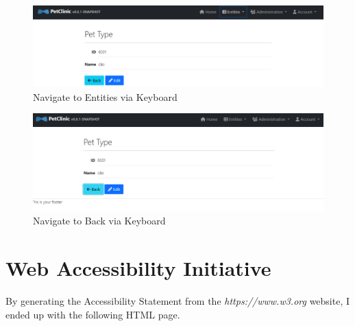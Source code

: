 \documentclass[a4paper,11pt,openright,BCOR=15mm]{scrbook}
\begin{document}
\begin{figure}[H]
	\centering
	\includegraphics[width=\textwidth]{figs/Accessibility/Entities Selected.png}
	\caption{Navigate to Entities via Keyboard}
	\label{fig:EntitiesSelected}
\end{figure}

\begin{figure}[H]
	\centering
	\includegraphics[width=\textwidth]{figs/Accessibility/Back Selected.png}
	\caption{Navigate to Back via Keyboard}
	\label{fig:BackSelected}
\end{figure}

\section{Web Accessibility Initiative}
By generating the Accessibility Statement from the \textit{https://www.w3.org} website, I ended up with the following HTML page. 
\end{document}
